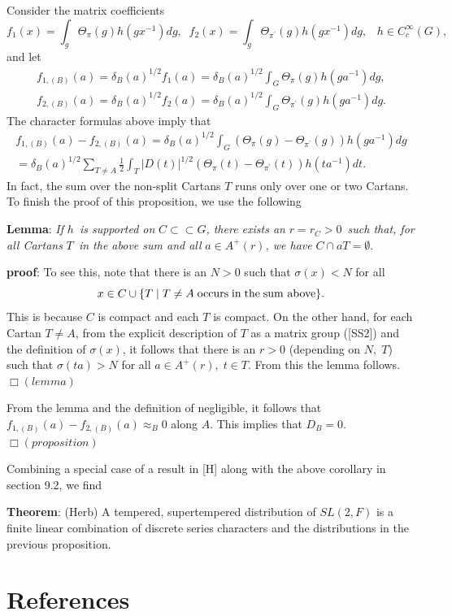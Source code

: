 Consider the matrix coefficients 
\[
f_1(x)=\int_g\Theta _\pi (g)h(gx^{-1})dg,\;\;f_2(x)=\int_g\Theta _{\pi
^{\prime }}(g)h(gx^{-1})dg,\;\;\;h\in C_c^\infty (G), 
\]
and let 
\[
\begin{array}{c}
f_{1,(B)}(a)=\delta _B(a)^{1/2}f_1(a)=\delta _B(a)^{1/2}\int_G\Theta _\pi
(g)h(ga^{-1})dg, \\ 
f_{2,(B)}(a)=\delta _B(a)^{1/2}f_2(a)=\delta _B(a)^{1/2}\int_G\Theta _{\pi
^{\prime }}(g)h(ga^{-1})dg.
\end{array}
\]
The character formulas above imply that 
\[
\begin{array}{c}
f_{1,(B)}(a)-f_{2,(B)}(a)=\delta _B(a)^{1/2}\int_G(\Theta _\pi (g)-\Theta
_{\pi ^{\prime }}(g))h(ga^{-1})dg \\ 
=\delta _B(a)^{1/2}\sum_{T\neq A}\frac 12\int_T|D(t)|^{1/2}(\Theta _\pi
(t)-\Theta _{\pi ^{\prime }}(t))h(ta^{-1})dt.
\end{array}
\]
In fact, the sum over the non-split Cartans $T$ runs only over one or two
Cartans. To finish the proof of this proposition, we use the following

{\bf Lemma}: {\em If }$h${\em \ is supported on }$C\subset \subset G${\em ,
there exists an }$r=r_C>0${\em \ such that, for all Cartans }$T${\em \ in
the above sum and all }$a\in A^{+}(r)${\em , we have }$C\cap aT=\emptyset .$

{\bf proof}: To see this, note that there is an $N>0$ such that $\sigma
(x)<N $ for all
\[
x\in C\cup \{T\;|\;T\neq A\;{\rm occurs\;in\;the\;sum\  above}\}.
\]
This is because $C$ is compact and each $T$ is compact. On the other
hand, for each Cartan $T\neq A$, from the explicit description of $T$ as a
matrix group ([SS2]) and the definition of $\sigma (x)$, it follows that
there is an $r>0$ (depending on $N,\;T$) such that $\sigma (ta)>N$ for all
$a\in A^{+}(r),\;t\in T$. From this the lemma follows. $\Box (lemma)$

From the lemma and the definition of negligible, it follows that
$f_{1,(B)}(a)-f_{2,(B)}(a)\approx _B0$ along $A$. This implies that $D_B=0$.
$\Box (proposition)$

Combining a special case of a result in [H] along with the above corollary
in section 9.2, we find

{\bf Theorem}: (Herb) A tempered, supertempered distribution of $SL(2,F)$ is
a finite linear combination of discrete series characters and the
distributions in the previous proposition.

\section{References}



